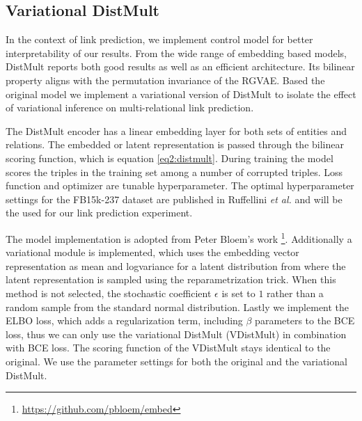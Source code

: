 \subsection{Variational DistMult}
\label{ssec4:vdistm}

In the context of link prediction, we implement control model for better interpretability of our results. From the wide range of embedding based models, DistMult reports both good results as well as an efficient architecture. Its bilinear property aligns with the permutation invariance of the RGVAE. Based the original model we implement a variational version of DistMult to isolate the effect of variational inference on multi-relational link prediction.

The DistMult encoder has a linear embedding layer for both sets of entities and relations. The embedded or latent representation is passed through the bilinear scoring function, which is equation \ref{eq2:distmult}. During training the model scores the triples in the training set among a number of corrupted triples. Loss function and optimizer are tunable hyperparameter. The optimal hyperparameter settings for the FB15k-237 dataset are published in Ruffellini \textit{et al.} \cite{ruffinelli_you_2019} and will be the used for our link prediction experiment.

The model implementation is adopted from Peter Bloem's work \footnote{\url{https://github.com/pbloem/embed}}. Additionally a variational module is implemented, which uses the embedding vector representation as mean and logvariance for a latent distribution from where the latent representation is sampled using the reparametrization trick. When this method is not selected, the stochastic coefficient $\epsilon$ is set to $1$ rather than a random sample from the standard normal distribution. Lastly we implement the ELBO loss, which adds a regularization term, including $\beta$ parameters to the BCE loss, thus we can only use the variational DistMult (VDistMult) in combination with BCE loss. The scoring function of the VDistMult stays identical to the original. We use the parameter settings for both the original and the variational DistMult. 



